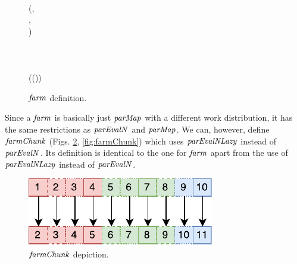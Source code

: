 \documentclass[paper=A4,twoside=true,openright,parskip=full,chapterprefix=true,headings=normal,bibliography=totoc,listof=totoc,titlepage=on,captions=tableabove,draft=false,british]{scrreprt}%
\begin{document}
\begin{figure}[h]
\centering
\begin{hscode}\SaveRestoreHook
{}%
%
%
\>[B]{}\;\mathrel{=}\<[E]%
\\[\blanklineskip]%
\>[B]{}\mathbin{::}(\;\;\;\;,{}\<[E]%
\\
\>[B]{}\<[5]%
\>[5]{}\;\;,{}\<[E]%
\\
\>[B]{}\<[5]%
\>[5]{}\;)\Rightarrow {}\<[E]%
\\
\>[B]{}\<[5]%
\>[5]{}\to {}\to {}\;\;\to {}\<[E]%
\\
\>[B]{}\;\;\;\mathrel{=}{}\<[E]%
\\
\>[B]{}\<[5]%
\>[5]{}\;\mathbin{>\!\!>\!\!>}{}\<[E]%
\\
\>[B]{}\<[5]%
\>[5]{}\;\;(\;(\;))\mathbin{>\!\!>\!\!>}{}\<[E]%
\\
\>[B]{}\<[5]%
\>[5]{}\<[E]%
\ColumnHook
\end{hscode}\resethooks
\caption{\ensuremath{\Varid{farm}} definition.}\label{fig:farm}\end{figure}

Since a \ensuremath{\Varid{farm}} is basically just \ensuremath{\Varid{parMap}} with a different work
distribution, it has the same restrictions as \ensuremath{\Varid{parEvalN}} and \ensuremath{\Varid{parMap}}.
We can, however, define \ensuremath{\Varid{farmChunk}} (Figs. \ref{fig:farmChunkImg}, \ref{fig:farmChunk})
which uses \ensuremath{\Varid{parEvalNLazy}} instead of \ensuremath{\Varid{parEvalN}}.
Its definition is identical to the one for \ensuremath{\Varid{farm}} apart from the use of
\ensuremath{\Varid{parEvalNLazy}} instead of \ensuremath{\Varid{parEvalN}}.

\begin{figure}[H]
\centering
\includegraphics{src/img/farmChunkImg.pdf}
\caption{\ensuremath{\Varid{farmChunk}} depiction.\label{fig:farmChunkImg}}
\end{figure}
\end{document}
